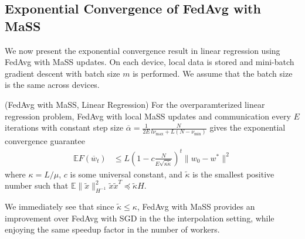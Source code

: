 \subsection{Exponential Convergence of FedAvg with MaSS}

We now present the exponential convergence result in linear regression
using FedAvg with MaSS updates. On each device, local data is stored
and mini-batch gradient descent with batch size $m$ is performed.
We assume that the batch size is the same across devices. 
\begin{theorem}
	(FedAvg with MaSS, Linear Regression) For the overparamterized linear
	regression problem, FedAvg with local MaSS updates and communication
	every $E$ iterations with constant step size $\overline{\alpha}=\frac{1}{2E}\frac{N}{l\nu_{\max}+L(N-\nu_{\min})}$
	gives the exponential convergence guarantee 
	\begin{align*}
	\mathbb{E}F(\overline{w}_{t}) & \leq L(1-c\frac{N}{E\sqrt{\kappa\tilde{\kappa}}})^{t}\|w_{0}-w^{\ast}\|^{2}
	\end{align*}
	where $\kappa=L/\mu$, $c$ is some universal constant, and $\tilde{\kappa}$
	is the smallest positive number such that $\mathbb{E}\|\tilde{x}\|_{H^{-1}}^{2}\tilde{x}\tilde{x}^{T}\preceq\tilde{\kappa}H$. 
	\label{th:fedmasslr}
\end{theorem}

We immediately see that since $\tilde{\kappa}\leq\kappa$, FedAvg with MaSS provides an improvement over FedAvg with SGD in the the interpolation setting, while enjoying the same speedup factor in the number of workers. 